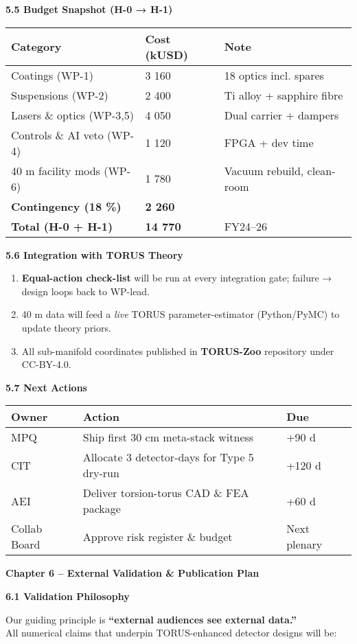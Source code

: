 \documentclass[]{article}
\begin{document}
\textbf{5.5 Budget Snapshot (H-0 → H-1)}

\begin{longtable}[]{@{}lll@{}}
\toprule
\textbf{Category} & \textbf{Cost (kUSD)} & \textbf{Note}\tabularnewline
\midrule
\endhead
Coatings (WP-1) & 3 160 & 18 optics incl. spares\tabularnewline
Suspensions (WP-2) & 2 400 & Ti alloy + sapphire fibre\tabularnewline
Lasers \& optics (WP-3,5) & 4 050 & Dual carrier +
dampers\tabularnewline
Controls \& AI veto (WP-4) & 1 120 & FPGA + dev time\tabularnewline
40 m facility mods (WP-6) & 1 780 & Vacuum rebuild,
clean-room\tabularnewline
\textbf{Contingency (18 \%)} & \textbf{2 260} &\tabularnewline
\textbf{Total (H-0 + H-1)} & \textbf{14 770} & FY24--26\tabularnewline
\bottomrule
\end{longtable}

\textbf{5.6 Integration with TORUS Theory}

\begin{enumerate}
\def\labelenumi{\arabic{enumi}.}
\item
  \textbf{Equal-action check-list} will be run at every integration
  gate; failure → design loops back to WP-lead.
\item
  40 m data will feed a \emph{live} TORUS parameter-estimator
  (Python/PyMC) to update theory priors.
\item
  All sub-manifold coordinates published in \textbf{TORUS-Zoo}
  repository under CC-BY-4.0.
\end{enumerate}

\textbf{5.7 Next Actions}

\begin{longtable}[]{@{}lll@{}}
\toprule
\textbf{Owner} & \textbf{Action} & \textbf{Due}\tabularnewline
\midrule
\endhead
MPQ & Ship first 30 cm meta-stack witness & +90 d\tabularnewline
CIT & Allocate 3 detector-days for Type 5 dry-run & +120
d\tabularnewline
AEI & Deliver torsion-torus CAD \& FEA package & +60 d\tabularnewline
Collab Board & Approve risk register \& budget & Next
plenary\tabularnewline
\bottomrule
\end{longtable}

\textbf{Chapter 6 -- External Validation \& Publication Plan}

\textbf{6.1 Validation Philosophy}

Our guiding principle is \textbf{``external audiences see external
data.''}\\
All numerical claims that underpin TORUS-enhanced detector designs will
be:
\end{document}
